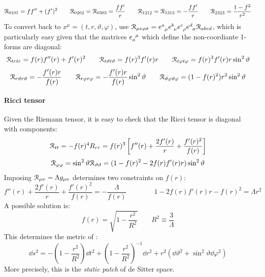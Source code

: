 \begin{equation*}
  \EuScript{R}_{0101} = f f'' + (f')^2
  \qquad
  \EuScript{R}_{0202} = \EuScript{R}_{0303} = \frac{f f'}{r}
  \qquad
  \EuScript{R}_{1212} = \EuScript{R}_{1313} = - \frac{f f'}{r}
  \qquad
  \EuScript{R}_{2323} = \frac{1 - f^2}{r^2}
\end{equation*}
To convert back to $ x^\mu = (t,r,\vartheta,\varphi) $, use $ \rr_{\mu \nu \rho \sigma} = \tensor{e}{^a_\mu} \tensor{e}{^b_\nu} \tensor{e}{^c_\rho} \tensor{e}{^d_\sigma} \rr_{abcd} $, which is particularly easy given that the matrices $ \tensor{e}{_a^\mu} $ which define the non-coordiante 1-forms are diagonal:
\begin{equation*}
  \EuScript{R}_{trtr} = f(r) f''(r) + f'(r)^2
  \qquad
  \EuScript{R}_{t \vartheta t \vartheta} = f(r)^3 f'(r) r
  \qquad
  \EuScript{R}_{t \varphi t \varphi} = f(r)^3 f'(r) r \sin^2 \vartheta
\end{equation*}
\begin{equation*}
  \EuScript{R}_{r \vartheta r \vartheta} = - \frac{f'(r) r}{f(r)}
  \qquad
  \EuScript{R}_{r \varphi r \varphi} = - \frac{f'(r) r}{f(r)} \sin^2 \vartheta
  \qquad
  \EuScript{R}_{\vartheta \varphi \vartheta \varphi} = (1 - f(r)^2) r^2 \sin^2 \vartheta
\end{equation*}

\paragraph{Ricci tensor}

Given the Riemann tensor, it is easy to check that the Ricci tensor is diagonal with components:
\begin{equation*}
  \EuScript{R}_{tt} = - f(r)^4 R_{rr} = f(r)^3 \left[ f''(r) + \frac{2f'(r)}{r} + \frac{f'(r)^2}{f(r)} \right]
\end{equation*}
\begin{equation*}
  \EuScript{R}_{\varphi \varphi} = \sin^2 \vartheta \EuScript{R}_{\vartheta \vartheta} = (1 - f(r)^2 - 2 f(r) f'(r) r) \sin^2 \vartheta
\end{equation*}
Imposing $ \EuScript{R}_{\mu \nu} = \Lambda g_{\mu \nu} $ determines two constraints on $ f(r) $:
\begin{equation*}
  f''(r) + \frac{2f'(r)}{r} + \frac{f'(r)^2}{f(r)} = - \frac{\Lambda}{f(r)}
  \qquad \qquad
  1 - 2 f(r) f'(r) r - f(r)^2 = \Lambda r^2
\end{equation*}
A possible solution is:
\begin{equation*}
  f(r) = \sqrt{1 - \frac{r^2}{R^2}}
  \qquad
  R^2 \equiv \frac{3}{\Lambda}
\end{equation*}
This determines the metric of :
\begin{equation}
  \dd s^2 = - \left( 1 - \frac{r^2}{R^2} \right) \dd t^2 + \left( 1 - \frac{r^2}{R^2} \right)^{-1} \dd r^2 + r^2 (\dd \vartheta^2 + \sin^2 \vartheta \dd \varphi^2)
  \label{eq:dS-metric}
\end{equation}
More precisely, this is the \textit{static patch} of de Sitter space.

